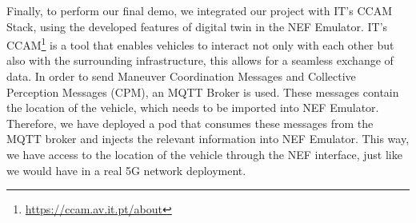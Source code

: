 Finally, to perform our final demo, we integrated our project with IT's CCAM
Stack, using the developed features of digital twin in the NEF Emulator. IT's
CCAM\footnote{\url{https://ccam.av.it.pt/about}} is a tool that enables
vehicles to interact not only with each other but also with the surrounding
infrastructure, this allows for a seamless exchange of data. In order to send
Maneuver Coordination Messages \cite{MCM} and Collective Perception Messages
(CPM), an MQTT Broker is used. These messages contain the location of the
vehicle, which needs to be imported into NEF Emulator. Therefore, we have
deployed a pod that consumes these messages from the MQTT broker and injects
the relevant information into NEF Emulator. This way, we have access to the
location of the vehicle through the NEF interface, just like we would have in a
real 5G network deployment.
